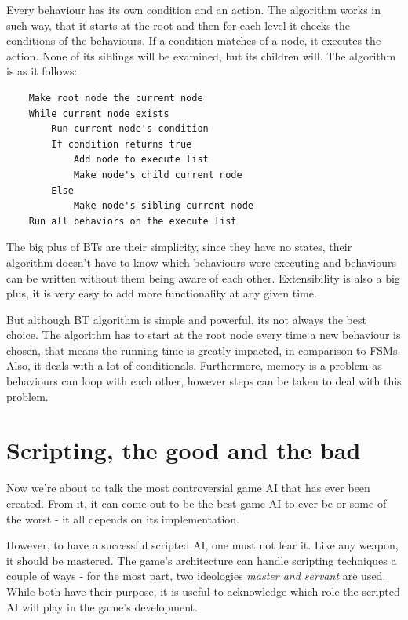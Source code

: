 \documentclass[a4paper, 12pt]{book}
\begin{document}
Every behaviour has its own condition and an action. The algorithm works in such way, that it starts at the root and then for each level it checks the conditions of the behaviours. If a condition matches of a node, it executes the action. None of its siblings will be examined, but its children will. The algorithm \cite{BehaviourSelectionAlgorithms} is as it follows:
\clearpage
\begin{verbatim}
    Make root node the current node
    While current node exists
        Run current node's condition
        If condition returns true
            Add node to execute list
            Make node's child current node
        Else
            Make node's sibling current node
    Run all behaviors on the execute list
\end{verbatim}

The big plus of BTs \cite{BehaviourSelectionAlgorithms} are their simplicity, since they have no states, their algorithm doesn't have to know which behaviours were executing and behaviours can be written without them being aware of each other. Extensibility is also a big plus, it is very easy to add more functionality at any given time.

But although BT algorithm is simple and powerful, its not always the best choice. The algorithm has to start at the root node every time a new behaviour is chosen, that means the running time is greatly impacted, in comparison to FSMs. Also, it deals with a lot of conditionals. Furthermore, memory is a problem as behaviours can loop with each other, however steps can be taken to deal with this problem.

\section{Scripting, the good and the bad}

Now we're about to talk the most controversial game AI that has ever been created. From it, it can come out to be the best game AI to ever be or some of the worst - it all depends on its implementation.

However, to have a successful scripted AI, one must not fear it. Like any weapon, it should be mastered. 
The game's architecture can handle scripting techniques a couple of ways - for the most part, two ideologies \emph{master and servant} \cite{ForbiddenScripting} are used. While both have their purpose, it is useful to acknowledge which role the scripted AI will play in the game's development.
\end{document}
